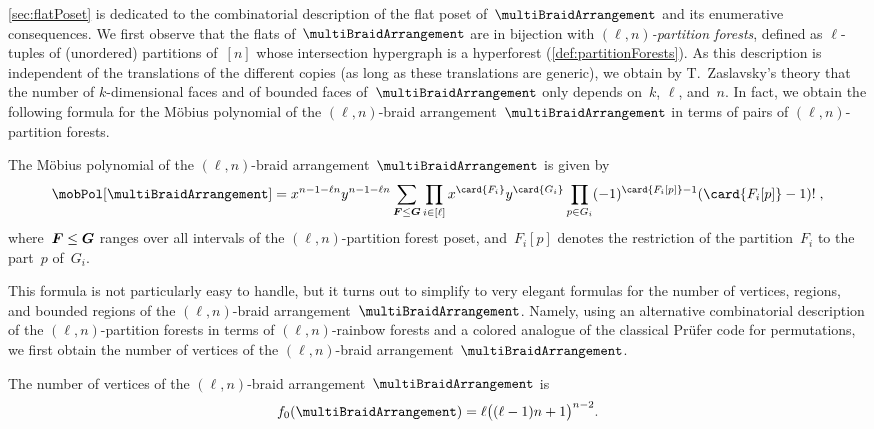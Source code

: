 \cref{sec:flatPoset} is dedicated to the combinatorial description of the flat poset of~$\multiBraidArrangement$ and its enumerative consequences.
We first observe that the flats of~$\multiBraidArrangement$ are in bijection with \emph{$(\ell,n)$-partition forests}, defined as $\ell$-tuples of (unordered) partitions of~$[n]$ whose intersection hypergraph is a hyperforest (\cref{def:partitionForests}).
As this description is independent of the translations of the different copies (as long as these translations are generic), we obtain by T.~Zaslavsky's theory that the number of \mbox{$k$-dimensional} faces and of bounded faces of~$\multiBraidArrangement$ only depends on~$k$, $\ell$, and~$n$. %
In fact, we obtain the following formula for the M\"obius polynomial of the $(\ell,n)$-braid arrangement~$\multiBraidArrangement$ in terms of pairs of $(\ell,n)$-partition forests.

\begin{theorem*}
The M\"obius polynomial of the $(\ell,n)$-braid arrangement~$\multiBraidArrangement$ is given by
\[
\mobPol[\multiBraidArrangement] = x^{n-1-\ell n} y^{n-1-\ell n} \sum_{\b{F} \le \b{G}} \prod_{i \in [\ell]} x^{\card{F_i}} y^{\card{G_i}} \prod_{p \in G_i} (-1)^{\card{F_i[p]}-1} (\card{F_i[p]}-1)! \; ,
\]
where~$\boldsymbol{F} \le \boldsymbol{G}$ ranges over all intervals of the $(\ell,n)$-partition forest poset, and~$F_i[p]$ denotes the restriction of the partition~$F_i$ to the part~$p$ of~$G_i$.
\end{theorem*}

This formula is not particularly easy to handle, but it turns out to simplify to very elegant formulas for the number of vertices, regions, and bounded regions of the $(\ell,n)$-braid arrangement~$\multiBraidArrangement$.
Namely, using an alternative combinatorial description of the $(\ell,n)$-partition forests in terms of $(\ell, n)$-rainbow forests and a colored analogue of the classical Pr\"ufer code for permutations, we first obtain the number of vertices of the $(\ell,n)$-braid arrangement~$\multiBraidArrangement$.

\begin{theorem*}
The number of vertices of the $(\ell,n)$-braid arrangement~$\multiBraidArrangement$ is
\[
f_0(\multiBraidArrangement) = \ell \big( (\ell-1) n + 1 \big)^{n-2}.
\]
\end{theorem*}


